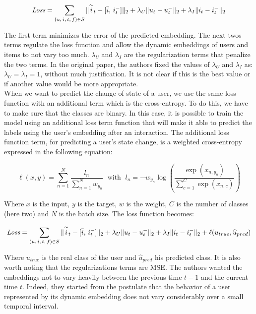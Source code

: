 \begin{equation}
    \textit{Loss} = \sum_{(u,\,i,\,t,\,f) \in S} \| \overset{\sim}{i}_t - [\Bar{i},\,i_t^-] \|_2 + \lambda_U \|u_t - u_t^-\|_2 + \lambda_I \|i_t - i_t^-\|_2
\end{equation}

The first term minimizes the error of the predicted embedding. The next twos terms regulate the loss function and allow the dynamic embeddings of users and items to not vary too much. $\lambda_U$ and $\lambda_I$ are the regularization terms that penalize the two terms. In the original paper, the authors fixed the values of $\lambda_U$ and $\lambda_I$ as: $\lambda_U = \lambda_I = 1$, without much justification. It is not clear if this is the best value or if another value would be more appropriate. \\

When we want to predict the change of state of a user, we use the same loss function with an additional term which is the cross-entropy. To do this, we have to make sure that the classes are binary. In this case, it is possible to train the model using an additional loss term function that will make it able to predict the labels using the user's embedding after an interaction. The additional loss function term, for predicting a user's state change, is a weighted cross-entropy expressed in the following equation:

\begin{equation}
    \ell(x,y) = \sum_{n=1}^N \frac{l_n}{\sum_{n=1}^N w_{y_n}} \; \text{ with } \;
    l_n = -w_{y_n} \log \left ( \frac{\exp(x_{n,y_n})}{\sum_{c=1}^C \exp(x_{n,c})} \right )
\end{equation}

Where $x$ is the input, $y$ is the target, $w$ is the weight, $C$ is the number of classes (here two) and $N$ is the batch size. The loss function becomes:

\begin{equation}
    \textit{Loss} = \sum_{(u,\,i,\,t,\,f) \in S} \| \overset{\sim}{i}_t - [\Bar{i},\,i_t^-] \|_2 + \lambda_U \|u_t - u_t^-\|_2 + \lambda_I \|i_t - i_t^-\|_2 + \ell (u_{true}, \widehat u_{pred})
\end{equation}

Where $u_{true}$ is the real class of the user and $\widehat u_{pred}$ his predicted class. It is also worth noting that the regularizations terms are MSE. The authors wanted the embeddings not to vary heavily between the previous time $t-1$ and the current time $t$. Indeed, they started from the postulate that the behavior of a user represented by its dynamic embedding does not vary considerably over a small temporal interval.\\

